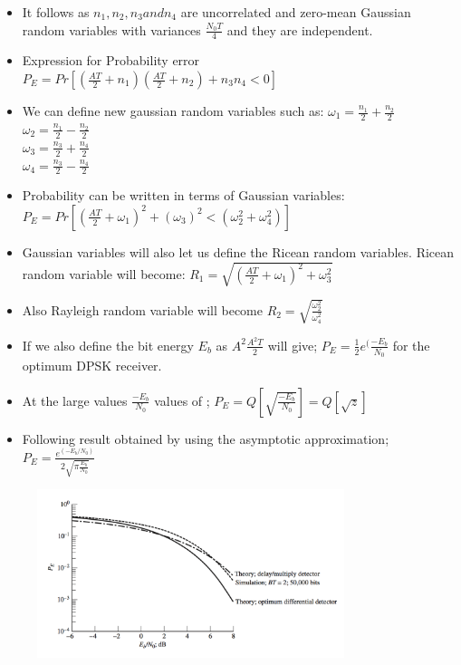 \documentclass{beamer}
\begin{document}
\begin{frame}
	\begin{itemize}
		\item It follows as $n_1, n_2, n_3 and n_4$ are uncorrelated and zero-mean Gaussian random variables with variances $\frac{N_0 T}{4}$ and they are independent.
		\item Expression for Probability error $P_E= Pr [(\frac{A T}{2}+n_1)(\frac{A T}{2}+n_2)+n_3 n_4<0]$
		\item We can define new gaussian random variables  such as:
		$ \omega_1=\frac{n_1}{2}+\frac{n_2}{2} $ \\
		$ \omega_2=\frac{n_1}{2}-\frac{n_2}{2}  $\\
		$ \omega_3=\frac{n_3}{2}+\frac{n_4}{2}$ \\
		$ \omega_4=\frac{n_3}{2}-\frac{n_4}{2} $
	\end{itemize}
\end{frame}

\begin{frame}
	\begin{itemize}
		\item Probability can be written in terms of Gaussian variables:
		$P_E= Pr [(\frac{A T}{2}+\omega_1)^2 +(\omega_3)^2<(\omega_2^2+\omega_4^2)]$
		\item Gaussian variables will also let us define the Ricean random variables. Ricean random variable will become: $R_1=\sqrt{(\frac{AT}{2}+\omega_1)^2+\omega_3^2}$
		\item Also Rayleigh random variable will become $R_2=\sqrt{\frac{\omega_2^2}{\omega_4^2}}$
		\item If we also define the bit energy $E_b$ as $A^2 \frac{A^2 T}{2}$ will give;
		$P_E=\frac{1}{2} e^(\frac{-E_b}{N_0}$ for the optimum DPSK receiver.
		\item At the large values  $\frac{-E_b}{N_0}$ values of ;
		$P_E=Q[\sqrt{\frac{-E_b}{N_0}}]=Q[\sqrt{z}]$
	\end{itemize}
\end{frame}

\begin{frame}
	\begin{itemize}
	\item Following result obtained by using the asymptotic approximation;
	$P_E=\frac{e^(-E_b/N_0)}{2 \sqrt{\pi \frac {E_b}{N_0}}}$
	\end{itemize}
\begin{figure}
	\includegraphics[width=0.8\textwidth]{9_5.png}
\end{figure}
\end{frame}
\end{document}
